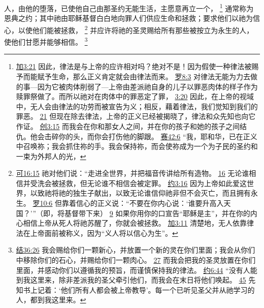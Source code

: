 \documentclass[12pt, a4paper, oneside]{ctexart}
\newcounter{parnum}[section]
\newcommand{\N}{%
   \noindent\refstepcounter{parnum}%
    \makebox[\parindent][l]{\textbf{\arabic{parnum}.}}}
\begin{document}
\N 人，由他的堕落，已使他自己由那圣约无能生活，主愿意再立一个，
	\footnote {
		\href{https://biblehub.com/galatians/3-21.htm}{加3:21} 因此，律法是与上帝的应许相对吗？绝对不是！因为假使一种律法被赐予而能赋予生命，那么正义肯定就会由律法而来。
		\href{https://biblehub.com/romans/8-3.htm}{罗8:3} 对律法无能为力去做的事---因为它被肉体削弱了---上帝由差派祂自身的儿子以罪恶肉体的样子作为赎罪祭做了。而所以祂对在肉体中的罪恶定了罪，
		\href{https://biblehub.com/romans/3-20.htm}{3:20} 因此，在上帝的视域中，无人会由律法的功劳而被宣告为义；相反，藉着律法，我们觉知到我们的罪恶。
		\href{https://biblehub.com/romans/3-21.htm}{21} 但现在除去律法，上帝的正义已经被揭晓了，律法和众先知也向它作证。
		\href{https://biblehub.com/genesis/3-15.htm}{创3:15} 而我会在你和那女人之间，并在你的孩子和她的孩子之间结仇。他会击碎你的头，而你会打伤他的脚跟。
		\href{https://biblehub.com/isaiah/42-6.htm}{赛42:6} “我，耶和华，已在正义中召唤祢；我会抓住祢的手。我会保持祢，而会使祢成为一个为子民的圣约和一束为外邦人的光，
	}
	通常称为恩典之约；其中祂由耶稣基督白白地向罪人们供应生命和拯救；要求他们以祂为信心，以使他们能被拯救，
	\footnote {
		\href{https://biblehub.com/mark/16-15.htm}{可16:15} 祂对他们说：“走进全世界，并把福音传讲给所有造物。
		\href{https://biblehub.com/mark/16-16.htm}{16} 无论谁相信并受洗会被拯救，但无论谁不相信会被定罪。
		\href{https://biblehub.com/john/3-16.htm}{约3:16} 因为上帝如此爱这世界，以致祂将祂的独生子献出，以致无论谁信仰祂非但不会灭亡，而且拥有永生。
		\href{https://biblehub.com/romans/10-6.htm}{罗10:6} 但靠着信心的正义说：“不要在你内心说：‘谁要升高入天国？’”（即，将基督带下来）
		\href{https://biblehub.com/romans/10-9.htm}{9} 如果你用你的口宣告“耶稣是主”，并在你的内心相信上帝从死人将祂苏醒了，你就会被拯救。
		\href{https://biblehub.com/galatians/3-11.htm}{加3:11} 清楚地，无人依靠律法在上帝面前被称义，因为“义人将以信心为生”。
	}
	并应许将祂的圣灵赐给所有那些被按立为永生的人，使他们甘愿并能够相信。
	\footnote {
		\href{https://biblehub.com/ezekiel/36-26.htm}{结36:26} 我会赐给你们一颗新心，并放置一个新的灵在你们里面；我会从你们中移除你们的石心，并赐给你们一颗肉心。
		\href{https://biblehub.com/ezekiel/36-27.htm}{27} 而我会把我的圣灵放置在你们里面，并感动你们以遵循我的预旨，而谨慎保持我的律法。
		\href{https://biblehub.com/john/6-44.htm}{约6:44} “没有人能到我这里来，除非差派我的圣父牵引他们，而我会在末日将他们唤起。
		\href{https://biblehub.com/john/6-45.htm}{45} 先知书上记着：‘他们所有人都会被上帝教导’。每一个已听见圣父并从祂学习的人，都到我这里来。
	}
\end{document}
